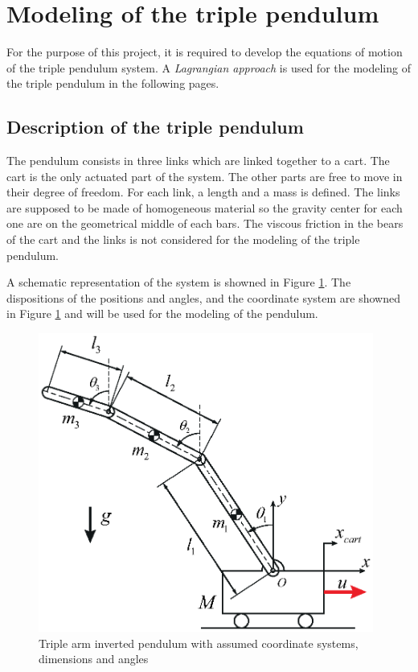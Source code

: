 \documentclass[a4paper,12pt,twoside]{article}
\begin{document}
\section{Modeling of the triple pendulum}
For the purpose of this project, it is required to develop the equations of motion of the triple pendulum system. A \emph{Lagrangian approach} is used for the modeling of the triple pendulum in the following pages.

\subsection{Description of the triple pendulum}
The pendulum consists in three links which are linked together to a cart. The cart is the only actuated part of the system. The other parts are free to move in their degree of freedom. For each link, a length and a mass is defined. The links are supposed to be made of homogeneous material so the gravity center for each one are on the geometrical middle of each bars. The viscous friction in the bears of the cart and the links is not considered for the modeling of the triple pendulum.

A schematic representation of the system is showned in Figure \ref{fig:schematic_system}. The dispositions of the positions and angles, and the coordinate system are showned in Figure \ref{fig:schematic_system} and will be used for the modeling of the pendulum.
\begin{figure}[ht]
	\centering
	\includegraphics[width=11cm]{illustrations/schematic_system.eps}
	\caption{Triple arm inverted pendulum with assumed coordinate systems, dimensions and angles}
	\label{fig:schematic_system}
\end{figure}
\end{document}
